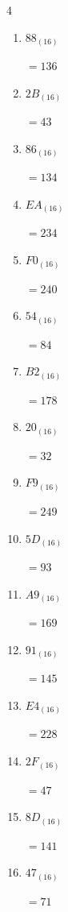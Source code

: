 \begin{multicols}{4}
\begin{enumerate}
        $=173$

  \item $88_{(16)}$

        $=136$

  \item $2B_{(16)}$

        $=43$

  \item $86_{(16)}$

        $=134$

  \item $EA_{(16)}$

        $=234$

  \item $F0_{(16)}$

        $=240$

  \item $54_{(16)}$

        $=84$

  \item $B2_{(16)}$

        $=178$

  \item $20_{(16)}$

        $=32$

  \item $F9_{(16)}$

        $=249$

  \item $5D_{(16)}$

        $=93$

  \item $A9_{(16)}$

        $=169$

\columnbreak %

  \item $91_{(16)}$

        $=145$

  \item $E4_{(16)}$

        $=228$

  \item $2F_{(16)}$

        $=47$

  \item $8D_{(16)}$

        $=141$

  \item $47_{(16)}$

        $=71$


\end{enumerate}
\end{multicols}

